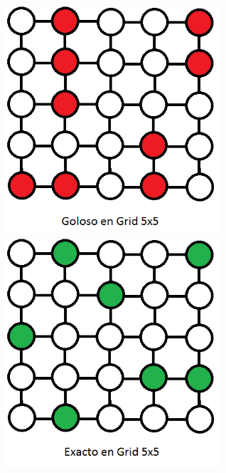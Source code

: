 \includegraphics[width=8cm]{./graficos/grid_5x5_goloso.png}
\includegraphics[width=8cm]{./graficos/grid_5x5_exacto.png}


